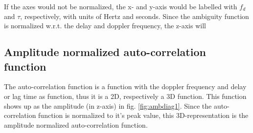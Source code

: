 If the axes would not be normalized, the x- and y-axis would be labelled with $f_d$ and $\tau$, respectively, with units of Hertz and seconds. Since the ambiguity function is normalized w.r.t. the delay and doppler frequency, the z-axis will 

\subsection{Amplitude normalized auto-correlation function}
The auto-correlation function is a function with the doppler frequency and delay or lag time as function, thus it is a 2D, respectively a 3D function. This function shows up as the amplitude (in z-axis) in fig. \ref{fig:ambdiag1}. Since the auto-correlation function is normalized to it's peak value, this 3D-representation is the amplitude normalized auto-correlation function.


